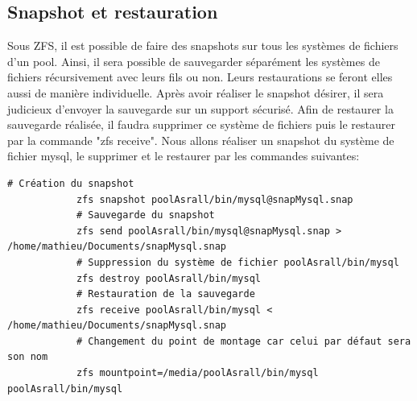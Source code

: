 \documentclass[a4paper]{report}
\begin{document}
		\subsection{Snapshot et restauration}
			Sous ZFS, il est possible de faire des snapshots sur tous les systèmes de fichiers d'un pool. Ainsi, il sera possible de sauvegarder séparément les systèmes de fichiers récursivement avec leurs fils ou non. Leurs restaurations se feront elles aussi de manière individuelle. Après avoir réaliser le snapshot désirer, il sera judicieux d'envoyer la sauvegarde sur un support sécurisé. Afin de restaurer la sauvegarde réalisée, il faudra supprimer ce système de fichiers puis le restaurer par la commande "zfs receive". Nous allons réaliser un snapshot du système de fichier mysql, le supprimer et le restaurer par les commandes suivantes:
		\begin{lstlisting}[language=ksh,texcl]
			# Création du snapshot
			zfs snapshot poolAsrall/bin/mysql@snapMysql.snap
			# Sauvegarde du snapshot
			zfs send poolAsrall/bin/mysql@snapMysql.snap > /home/mathieu/Documents/snapMysql.snap
			# Suppression du système de fichier poolAsrall/bin/mysql
			zfs destroy poolAsrall/bin/mysql
			# Restauration de la sauvegarde
			zfs receive poolAsrall/bin/mysql < /home/mathieu/Documents/snapMysql.snap
			# Changement du point de montage car celui par défaut sera son nom
			zfs mountpoint=/media/poolAsrall/bin/mysql poolAsrall/bin/mysql 
		\end{lstlisting}
		
\end{document}
